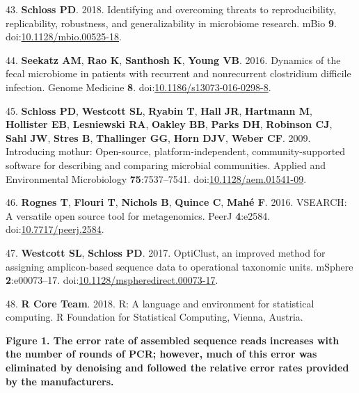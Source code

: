 \documentclass[11pt,]{article}
\begin{document}
\leavevmode\hypertarget{ref-Schloss2018}{}%
43. \textbf{Schloss PD}. 2018. Identifying and overcoming threats to
reproducibility, replicability, robustness, and generalizability in
microbiome research. mBio \textbf{9}.
doi:\href{https://doi.org/10.1128/mbio.00525-18}{10.1128/mbio.00525-18}.

\leavevmode\hypertarget{ref-Seekatz2016}{}%
44. \textbf{Seekatz AM}, \textbf{Rao K}, \textbf{Santhosh K},
\textbf{Young VB}. 2016. Dynamics of the fecal microbiome in patients
with recurrent and nonrecurrent clostridium difficile infection. Genome
Medicine \textbf{8}.
doi:\href{https://doi.org/10.1186/s13073-016-0298-8}{10.1186/s13073-016-0298-8}.

\leavevmode\hypertarget{ref-Schloss2009}{}%
45. \textbf{Schloss PD}, \textbf{Westcott SL}, \textbf{Ryabin T},
\textbf{Hall JR}, \textbf{Hartmann M}, \textbf{Hollister EB},
\textbf{Lesniewski RA}, \textbf{Oakley BB}, \textbf{Parks DH},
\textbf{Robinson CJ}, \textbf{Sahl JW}, \textbf{Stres B},
\textbf{Thallinger GG}, \textbf{Horn DJV}, \textbf{Weber CF}. 2009.
Introducing mothur: Open-source, platform-independent,
community-supported software for describing and comparing microbial
communities. Applied and Environmental Microbiology
\textbf{75}:7537--7541.
doi:\href{https://doi.org/10.1128/aem.01541-09}{10.1128/aem.01541-09}.

\leavevmode\hypertarget{ref-Rognes2016}{}%
46. \textbf{Rognes T}, \textbf{Flouri T}, \textbf{Nichols B},
\textbf{Quince C}, \textbf{Mahé F}. 2016. VSEARCH: A versatile open
source tool for metagenomics. PeerJ \textbf{4}:e2584.
doi:\href{https://doi.org/10.7717/peerj.2584}{10.7717/peerj.2584}.

\leavevmode\hypertarget{ref-Westcott2017}{}%
47. \textbf{Westcott SL}, \textbf{Schloss PD}. 2017. OptiClust, an
improved method for assigning amplicon-based sequence data to
operational taxonomic units. mSphere \textbf{2}:e00073--17.
doi:\href{https://doi.org/10.1128/mspheredirect.00073-17}{10.1128/mspheredirect.00073-17}.

\leavevmode\hypertarget{ref-r_citation_2018}{}%
48. \textbf{R Core Team}. 2018. R: A language and environment for
statistical computing. R Foundation for Statistical Computing, Vienna,
Austria.

\newpage

\textbf{Figure 1. The error rate of assembled sequence reads increases
with the number of rounds of PCR; however, much of this error was
eliminated by denoising and followed the relative error rates provided
by the manufacturers.}
\end{document}
